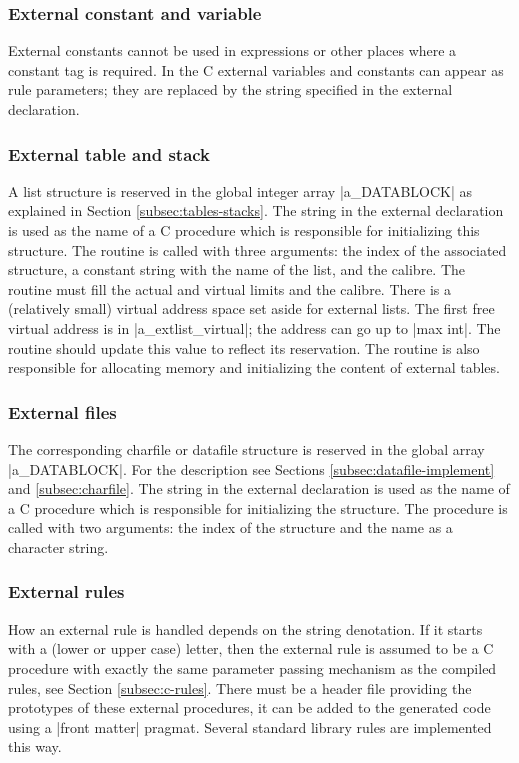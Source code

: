 \documentclass{article}
\newcommand\g[1]{\textsf{#1}}
\begin{document}
\subsubsection{External constant and variable}

External constants cannot be used in expressions or other places where a 
constant tag is required. In the {\sf C} external variables and constants 
can appear as rule parameters; they are replaced by the string specified in 
the \g{external declaration}.

\subsubsection{External table and stack}

A list structure is reserved in the global integer array \pp|a\_DATABLOCK|
as explained in Section \ref{subsec:tables-stacks}. The string in the
external declaration is used as the name of a {\sf C} procedure which is
responsible for initializing this structure. The routine is called with
three arguments: the index of the associated structure, a constant string
with the name of the list, and the calibre.
The routine must fill the actual and virtual limits and the calibre.
There is a (relatively small) virtual address space set aside for external
lists. The first free virtual address is in \pp|a\_extlist\_virtual|; the
address can go up to \pp|max int|. The routine should update this value to
reflect its reservation. The routine is also responsible for allocating memory
and initializing the content of external tables.

\subsubsection{External files}

The corresponding charfile or datafile structure is reserved in the global
array \pp|a\_DATABLOCK|. For the description see Sections
\ref{subsec:datafile-implement} and \ref{subsec:charfile}. The string in the
external declaration is used as the name of a {\sf C} procedure which is
responsible for
initializing the structure. The procedure is called with two arguments:
the index of the structure and the name as a character string.

\subsubsection{External rules}

How an external rule is handled depends on the \g{string denotation}. If it
starts with a (lower or upper case) letter, then the external rule is
assumed to be a {\sf C} procedure with exactly the same parameter passing
mechanism as the compiled rules, see Section \ref{subsec:c-rules}. There
must be a header file providing the prototypes of these external procedures,
it can be added to the generated code using a \pp|front matter| pragmat.
Several standard library rules are implemented this way.
\end{document}
